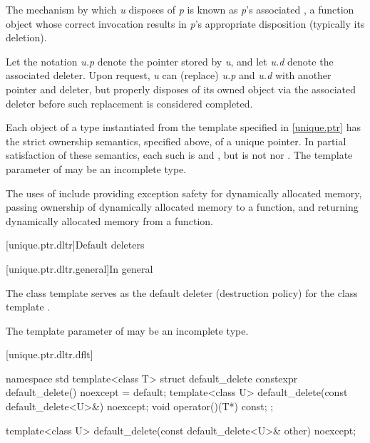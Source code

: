 \pnum
The mechanism by which \textit{u} disposes of \textit{p} is known as
\textit{p}'s associated , a function object whose correct
invocation results in \textit{p}'s appropriate disposition (typically its deletion).

\pnum
Let the notation \textit{u.p} denote the pointer stored by \textit{u}, and
let \textit{u.d} denote the associated deleter. Upon request, \textit{u} can
 (replace) \textit{u.p} and \textit{u.d} with another pointer and
deleter, but properly disposes of its owned object via the associated
deleter before such replacement is considered completed.

\pnum
Each object of a type  instantiated from the  template
specified in \ref{unique.ptr} has the strict ownership semantics, specified above,
of a unique pointer. In partial satisfaction of these semantics, each such 
is  and , but is not
 nor .
The template parameter  of  may be an incomplete type.

\pnum
\begin{note}
The uses
of  include providing exception safety for
dynamically allocated memory, passing ownership of dynamically allocated
memory to a function, and returning dynamically allocated memory from a
function.
\end{note}

[unique.ptr.dltr]{Default deleters}

[unique.ptr.dltr.general]{In general}

\pnum
The class template  serves as the default deleter (destruction policy)
for the class template .

\pnum
The template parameter  of  may be
an incomplete type.

[unique.ptr.dltr.dflt]{}

\begin{codeblock}
namespace std {
  template<class T> struct default_delete {
    constexpr default_delete() noexcept = default;
    template<class U> default_delete(const default_delete<U>&) noexcept;
    void operator()(T*) const;
  };
}
\end{codeblock}

%
\begin{itemdecl}
template<class U> default_delete(const default_delete<U>& other) noexcept;
\end{itemdecl}

